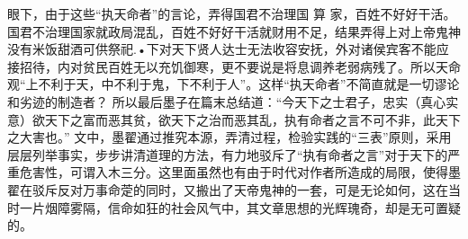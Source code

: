 {{眼下，由于这些“执天命者”的言论，弄得国君不治理国
算
家，百姓不好好干活。国君不治理国家就政局混乱，百姓不好好干活就财用不足，结果弄得上对上帝鬼神没有米饭甜酒可供祭祀.•下对天下贤人达士无法收容安抚，外对诸侯宾客不能应接招待，内对贫民百姓无以充饥御寒，更不要说是将息调养老弱病残了。所以天命观“上不利于天，中不利于鬼，下不利于人”。这样“执天命者”不简直就是一切谬论和劣迹的制造者？
所以最后墨子在篇末总结道：“今天下之士君子，忠实（真心实意）欲天下之富而恶其贫，欲天下之治而恶其乱，执有命者之言不可不非，此天下之大害也。”
文中，墨翟通过推究本源，弄清过程，检验实践的“三表”原则，采用层层列举事实，步步讲清道理的方法，有力地驳斥了“执有命者之言”对于天下的严重危害性，可谓入木三分。这里面虽然也有由于时代对作者所造成的局限，使得墨翟在驳斥反对万事命萣的同时，又搬出了天帝鬼神的一套，可是无论如何，这在当时一片烟障雾隔，信命如狂的社会风气中，其文章思想的光辉瑰奇，却是无可置疑的。
}}
